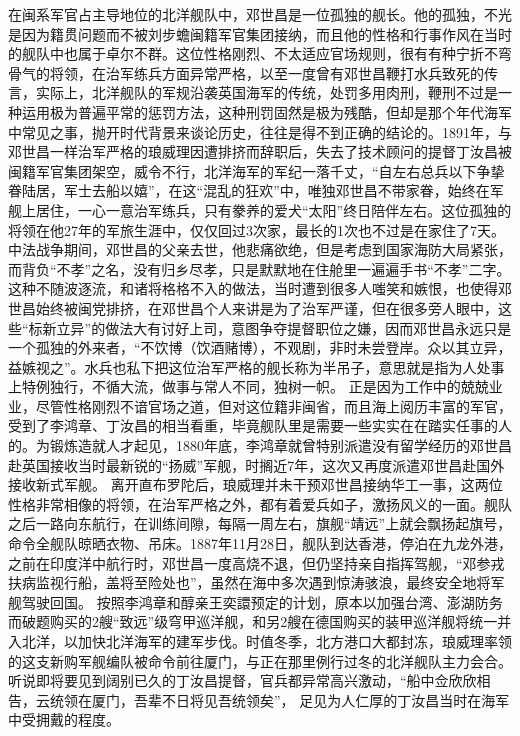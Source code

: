 \documentclass[12pt,UTF8]{ctexbook}
\begin{document}
在闽系军官占主导地位的北洋舰队中，邓世昌是一位孤独的舰长。他的孤独，不光是因为籍贯问题而不被刘步蟾闽籍军官集团接纳，而且他的性格和行事作风在当时的舰队中也属于卓尔不群。这位性格刚烈、不太适应官场规则，很有有种宁折不弯骨气的将领，在治军练兵方面异常严格，以至一度曾有邓世昌鞭打水兵致死的传言，实际上，北洋舰队的军规沿袭英国海军的传统，处罚多用肉刑，鞭刑不过是一种运用极为普遍平常的惩罚方法，这种刑罚固然是极为残酷，但却是那个年代海军中常见之事，抛开时代背景来谈论历史，往往是得不到正确的结论的。1891年，与邓世昌一样治军严格的琅威理因遭排挤而辞职后，失去了技术顾问的提督丁汝昌被闽籍军官集团架空，威令不行，北洋海军的军纪一落千丈，“自左右总兵以下争挚眷陆居，军士去船以嬉”，在这“混乱的狂欢”中，唯独邓世昌不带家眷，始终在军舰上居住，一心一意治军练兵，只有豢养的爱犬“太阳”终日陪伴左右。这位孤独的将领在他27年的军旅生涯中，仅仅回过3次家，最长的1次也不过是在家住了7天。中法战争期间，邓世昌的父亲去世，他悲痛欲绝，但是考虑到国家海防大局紧张，而背负“不孝”之名，没有归乡尽孝，只是默默地在住舱里一遍遍手书“不孝”二字。这种不随波逐流，和诸将格格不入的做法，当时遭到很多人嗤笑和嫉恨，也使得邓世昌始终被闽党排挤，在邓世昌个人来讲是为了治军严谨，但在很多旁人眼中，这些“标新立异”的做法大有讨好上司，意图争夺提督职位之嫌，因而邓世昌永远只是一个孤独的外来者，“不饮博（饮酒赌博），不观剧，非时未尝登岸。众以其立异，益嫉视之”。水兵也私下把这位治军严格的舰长称为半吊子，意思就是指为人处事上特例独行，不循大流，做事与常人不同，独树一帜。
正是因为工作中的兢兢业业，尽管性格刚烈不谙官场之道，但对这位籍非闽省，而且海上阅历丰富的军官，受到了李鸿章、丁汝昌的相当看重，毕竟舰队里是需要一些实实在在踏实任事的人的。为锻炼造就人才起见，1880年底，李鸿章就曾特别派遣没有留学经历的邓世昌赴英国接收当时最新锐的“扬威”军舰，时搁近7年，这次又再度派遣邓世昌赴国外接收新式军舰。
离开直布罗陀后，琅威理并未干预邓世昌接纳华工一事，这两位性格非常相像的将领，在治军严格之外，都有着爱兵如子，激扬风义的一面。舰队之后一路向东航行，在训练间隙，每隔一周左右，旗舰“靖远”上就会飘扬起旗号，命令全舰队晾晒衣物、吊床。1887年11月28日，舰队到达香港，停泊在九龙外港，之前在印度洋中航行时，邓世昌一度高烧不退，但仍坚持亲自指挥驾舰，“邓参戎扶病监视行船，盖将至险处也”，虽然在海中多次遇到惊涛骇浪，最终安全地将军舰驾驶回国。
按照李鸿章和醇亲王奕譞预定的计划，原本以加强台湾、澎湖防务而破题购买的2艘“致远”级穹甲巡洋舰，和另2艘在德国购买的装甲巡洋舰将统一并入北洋，以加快北洋海军的建军步伐。时值冬季，北方港口大都封冻，琅威理率领的这支新购军舰编队被命令前往厦门，与正在那里例行过冬的北洋舰队主力会合。听说即将要见到阔别已久的丁汝昌提督，官兵都异常高兴激动，“船中佥欣欣相告，云统领在厦门，吾辈不日将见吾统领矣”， 足见为人仁厚的丁汝昌当时在海军中受拥戴的程度。
\end{document}
